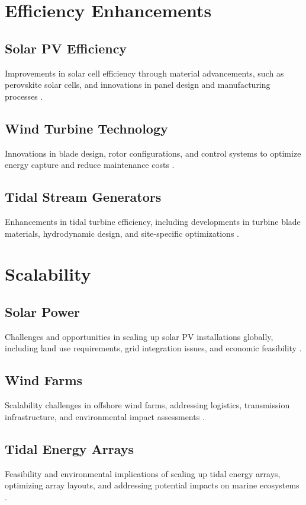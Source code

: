 \documentclass[12pt]{article}
\begin{document}
\section{Efficiency Enhancements}
\subsection{Solar PV Efficiency}
Improvements in solar cell efficiency through material advancements, such as perovskite solar cells, and innovations in panel design and manufacturing processes \citep{yang2017perovskite, zhao2017review}.

\subsection{Wind Turbine Technology}
Innovations in blade design, rotor configurations, and control systems to optimize energy capture and reduce maintenance costs \citep{wood2011advances, saito2013review}.

\subsection{Tidal Stream Generators}
Enhancements in tidal turbine efficiency, including developments in turbine blade materials, hydrodynamic design, and site-specific optimizations \citep{bahaj2019tidal, lewis2014tidal}.

\section{Scalability}
\subsection{Solar Power}
Challenges and opportunities in scaling up solar PV installations globally, including land use requirements, grid integration issues, and economic feasibility \citep{denholm2009land, feldman2016scaling}.

\subsection{Wind Farms}
Scalability challenges in offshore wind farms, addressing logistics, transmission infrastructure, and environmental impact assessments \citep{musial2010assessment, zhou2019towards}.

\subsection{Tidal Energy Arrays}
Feasibility and environmental implications of scaling up tidal energy arrays, optimizing array layouts, and addressing potential impacts on marine ecosystems \citep{bahaj2013impact, neill2018tidal}.
\end{document}
